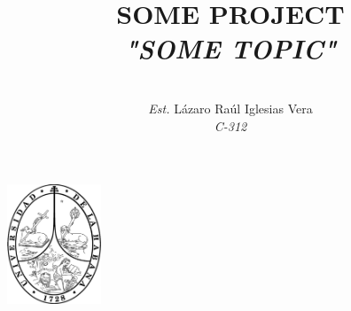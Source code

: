 \documentclass[a4paper,10pt]{article}
\begin{document}
	
	
	\begin{center}
		\includegraphics[width = 1.1in]{./images/escudo.png} 
	\end{center}
	
	
	\title{SOME PROJECT\\ \emph{ "SOME TOPIC" }}
	
	\vspace{4mm}
	
	\author{\\
		\name \emph{Est.} L\'azaro Ra\'ul Iglesias Vera \vspace{2mm}  \\
		\emph{C-312}    
	}
	\vspace{4mm}
	\maketitle
	
	
	
	
	\ShortHeadings{}{}
	
	
	
	
\end{document}
